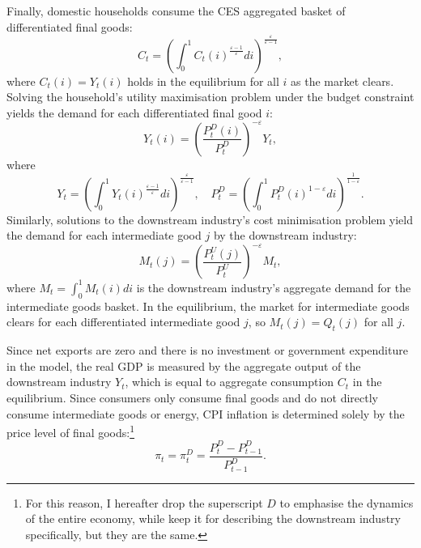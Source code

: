 \documentclass[a4paper, 12pt]{article}
\theoremstyle{definition*}
\begin{document}
Finally, domestic households consume the CES aggregated basket of differentiated final goods:
\begin{equation}
  C_t = \left(\int_0^1 C_t(i)^{\frac{\varepsilon - 1}{\varepsilon}} di\right)^{\frac{\varepsilon}{\varepsilon - 1}},
\end{equation}
where $C_t(i) = Y_t(i)$ holds in the equilibrium for all $i$ as the market clears.
Solving the household's utility maximisation problem under the budget constraint yields the demand for each differentiated final good $i$:
\begin{equation}\label{eq:demand_final}
  Y_t(i) = \left(\frac{P^D_t(i)}{P^D_t}\right)^{-\varepsilon}Y_t,
\end{equation}
where
\begin{equation}
  Y_t = \left(\int_0^1Y_t(i)^{\frac{\varepsilon - 1}{\varepsilon}} di\right)^{\frac{\varepsilon}{\varepsilon - 1}}, \quad P^D_t = \left(\int_0^1 P^D_t(i)^{1-\varepsilon} di\right)^{\frac{1}{1-\varepsilon}}.
\end{equation}
Similarly, solutions to the downstream industry's cost minimisation problem yield the demand for each intermediate good $j$ by the downstream industry:
\begin{equation}\label{eq:demand_intermediate}
  M_t(j) = \left(\frac{P^U_t(j)}{P^U_t}\right)^{-\varepsilon}M_t,
\end{equation}
where $M_t = \int_0^1M_t(i)di$ is the downstream industry's aggregate demand for the intermediate goods basket.
In the equilibrium, the market for intermediate goods clears for each differentiated intermediate good $j$, so $M_t(j) = Q_t(j)$ for all $j$.

Since net exports are zero and there is no investment or government expenditure in the model, the real GDP is measured by the aggregate output of the downstream industry $Y_t$, which is equal to aggregate consumption $C_t$ in the equilibrium.
Since consumers only consume final goods and do not directly consume intermediate goods or energy, CPI inflation is determined solely by the price level of final goods:\footnote{For this reason, I hereafter drop the superscript $D$ to emphasise the dynamics of the entire economy, while keep it for describing the downstream industry specifically, but they are the same.}
\begin{equation}
  \pi_t = \pi^D_t = \frac{P^D_t - P^D_{t-1}}{P^D_{t-1}}.
\end{equation}
\end{document}
